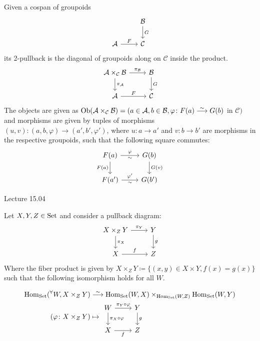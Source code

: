\begin{construction}
	\label{2-pullback_groupoids}
    Given a cospan of groupoids 
    \[
    \begin{tikzcd}
        &
        \mathcal{B}
        \ar[d, " G "]
        \\
        \mathcal{ A }
        \ar[r, " F "]
        &
        \mathcal{ C }
    \end{tikzcd}
    \]
    its 2-pullback is the diagonal of groupoids along on $ \mathcal{ C } $ inside the product.
    \[
    \begin{tikzcd}
        \mathcal{ A } \times_{ \mathcal{ C } } \mathcal{ B } 
        \ar[r, " \pi_{ \mathcal{ B }} "]
        \ar[d, " \pi_{ \mathcal{ A }} "]
        &
        \mathcal{ B }
        \ar[ d , " G " ]
        \\
        \mathcal{ A }
        \ar[r, " F " ]
        &
        \mathcal{ C }
    \end{tikzcd}
    \]
    The objects are given as $ \Ob ( \mathcal{ A } \times_\mathcal{ C } \mathcal{ B } ) = ( a \in \mathcal{ A } , b \in \mathcal{ B }, \varphi \colon F ( a ) \isomorphism G ( b ) $ in $ \mathcal{ C } )$ and morphisms are given by tuples of morphisms $ ( u , v ) \colon ( a , b, \varphi ) \to ( a' , b' , \varphi' ) $, where $ u \colon a \to a' $ and $ v \colon b \to b '$ are morphisms in the respective groupoids, such that the following square commutes:
    \[
    \begin{tikzcd}
        F ( a ) 
        \ar[r, " \varphi " , " \sim "']
        \ar[d, " F ( a ) "']
        &
        G ( b )
        \ar[d, " G ( v ) "]
        \\
        F ( a' )
        \ar[r, " \varphi' ", " \sim "']
        &
        G ( b' )
    \end{tikzcd}
    \]
\end{construction}

Lecture 15.04

Let $ X , Y , Z \in \operatorname{Set} $ and consider a pullback diagram:
\[
\begin{tikzcd}
	X \times_Z Y 
	\ar[r, " \pi_Y " ]
	\ar[d, " \pi_X"]
	&
	Y
	\ar[d, " g "]
	\\
	X
	\ar[r, " f "]
	&
	Z
\end{tikzcd}
\] 
Where the fiber product is given by $ X \times_Z Y \coloneqq \{ ( x , y ) \in  X \times Y , f ( x ) = g ( x ) \} $ such that the following isomorphism holds for all $ W $.

\begin{align*}
	\Hom_{ \Set } ( \prescript{\forall}{}{W} , X \times_Z Y ) 
	&\isomorphism 
	\Hom_{ \Set } ( W , X ) \times_{ \Hom_{ \Set } ( W , Z ) } \Hom_{ \Set } ( W , Y )
	\\
	( \varphi \colon X \times_Z  Y )
	&\mapsto
	\begin{tikzcd}
		[ampersand replacement = \&]
		W 
		\ar[r, " \pi_Y \circ \varphi"]
		\ar[d, " \pi_X \circ \varphi"]
		\&
		Y
		\ar[d, "g" ]
		\\
		X
		\ar[r, " f "' ]
		\&
		Z
	\end{tikzcd}
\end{align*}

